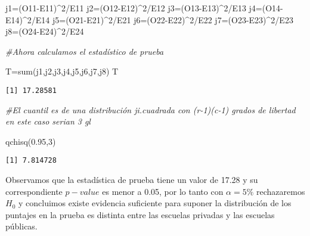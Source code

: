 \documentclass[
  a4paper,
  oneside,
  openany]{book}
\newenvironment{Shaded}{\begin{snugshade}}{\end{snugshade}}
\newcommand{\CommentTok}[1]{\textcolor[rgb]{0.56,0.35,0.01}{\textit{#1}}}
\newcommand{\DecValTok}[1]{\textcolor[rgb]{0.00,0.00,0.81}{#1}}
\newcommand{\FloatTok}[1]{\textcolor[rgb]{0.00,0.00,0.81}{#1}}
\newcommand{\FunctionTok}[1]{\textcolor[rgb]{0.00,0.00,0.00}{#1}}
\newcommand{\NormalTok}[1]{#1}
\newcommand{\OtherTok}[1]{\textcolor[rgb]{0.56,0.35,0.01}{#1}}
\newcommand{\SpecialCharTok}[1]{\textcolor[rgb]{0.00,0.00,0.00}{#1}}
\begin{document}
\begin{Shaded}
\begin{Highlighting}[]
\NormalTok{j1}\OtherTok{=}\NormalTok{(O11}\SpecialCharTok{{-}}\NormalTok{E11)}\SpecialCharTok{\^{}}\DecValTok{2}\SpecialCharTok{/}\NormalTok{E11}
\NormalTok{j2}\OtherTok{=}\NormalTok{(O12}\SpecialCharTok{{-}}\NormalTok{E12)}\SpecialCharTok{\^{}}\DecValTok{2}\SpecialCharTok{/}\NormalTok{E12}
\NormalTok{j3}\OtherTok{=}\NormalTok{(O13}\SpecialCharTok{{-}}\NormalTok{E13)}\SpecialCharTok{\^{}}\DecValTok{2}\SpecialCharTok{/}\NormalTok{E13}
\NormalTok{j4}\OtherTok{=}\NormalTok{(O14}\SpecialCharTok{{-}}\NormalTok{E14)}\SpecialCharTok{\^{}}\DecValTok{2}\SpecialCharTok{/}\NormalTok{E14}
\NormalTok{j5}\OtherTok{=}\NormalTok{(O21}\SpecialCharTok{{-}}\NormalTok{E21)}\SpecialCharTok{\^{}}\DecValTok{2}\SpecialCharTok{/}\NormalTok{E21}
\NormalTok{j6}\OtherTok{=}\NormalTok{(O22}\SpecialCharTok{{-}}\NormalTok{E22)}\SpecialCharTok{\^{}}\DecValTok{2}\SpecialCharTok{/}\NormalTok{E22}
\NormalTok{j7}\OtherTok{=}\NormalTok{(O23}\SpecialCharTok{{-}}\NormalTok{E23)}\SpecialCharTok{\^{}}\DecValTok{2}\SpecialCharTok{/}\NormalTok{E23}
\NormalTok{j8}\OtherTok{=}\NormalTok{(O24}\SpecialCharTok{{-}}\NormalTok{E24)}\SpecialCharTok{\^{}}\DecValTok{2}\SpecialCharTok{/}\NormalTok{E24}

\CommentTok{\#Ahora calculamos el estadístico de prueba}

\NormalTok{T}\OtherTok{=}\FunctionTok{sum}\NormalTok{(j1,j2,j3,j4,j5,j6,j7,j8)}
\NormalTok{T}
\end{Highlighting}
\end{Shaded}

\begin{verbatim}
[1] 17.28581
\end{verbatim}

\begin{Shaded}
\begin{Highlighting}[]
\CommentTok{\#El cuantil es de una distribución ji.cuadrada con (r{-}1)(c{-}1) grados de libertad en este caso serian 3 gl}

\FunctionTok{qchisq}\NormalTok{(}\FloatTok{0.95}\NormalTok{,}\DecValTok{3}\NormalTok{)}
\end{Highlighting}
\end{Shaded}

\begin{verbatim}
[1] 7.814728
\end{verbatim}

Observamos que la estadística de prueba tiene un valor de 17.28 y su correspondiente \(p-value\) es menor a 0.05, por lo tanto con \(\alpha=5\%\) rechazaremos \(H_0\) y concluimos existe evidencia suficiente para suponer la distribución de los puntajes en la prueba es distinta entre las escuelas privadas y las escuelas públicas.
\end{document}
